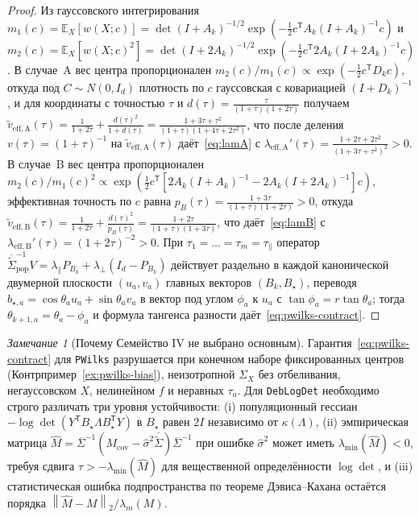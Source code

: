 \documentclass[11pt,a4paper]{article}
\numberwithin{equation}{section}
\theoremstyle{definition}
\theoremstyle{remark}
\newtheorem{remark}[theorem]{Замечание}
\newcommand{\E}{\mathbb{E}}
\newcommand{\T}{^{\mathsf T}}
\newcommand{\norm}[1]{\left\lVert #1 \right\rVert}
\begin{document}
\begin{proof}
Из гауссовского интегрирования $m_1(c) = \E_X[w(X;c)] = \det(I+A_k)^{-1/2} \exp(-\frac{1}{2} c\T A_k(I+A_k)^{-1} c)$
и $m_2(c) = \E_X[w(X;c)^2] = \det(I+2A_k)^{-1/2} \exp(-\frac{1}{2} c\T 2A_k(I+2A_k)^{-1} c)$.
В случае~A вес центра пропорционален $m_2(c)/m_1(c) \propto \exp(-\frac{1}{2} c\T D_k c)$,
откуда под $C \sim N(0, I_d)$ плотность по $c$ гауссовская с ковариацией $(I + D_k)^{-1}$,
и для координаты с точностью $\tau$ и $d(\tau) = \frac{\tau}{(1+\tau)(1+2\tau)}$ получаем
$\tilde{v}_{\mathrm{eff,A}}(\tau) = \frac{1}{1+2\tau} + \frac{d(\tau)^2}{1 + d(\tau)} = \frac{1+3\tau+\tau^2}{(1+\tau)(1+4\tau+2\tau^2)}$,
что после деления $v(\tau) = (1+\tau)^{-1}$ на $\tilde{v}_{\mathrm{eff,A}}(\tau)$ даёт~\eqref{eq:lamA}
с $\lambda_{\mathrm{eff,A}}'(\tau) = \frac{1+2\tau+2\tau^2}{(1+3\tau+\tau^2)^2} > 0$.
В случае~B вес центра пропорционален $m_2(c)/m_1(c)^2 \propto \exp(\frac{1}{2} c\T [2A_k(I+A_k)^{-1} - 2A_k(I+2A_k)^{-1}] c)$,
эффективная точность по $c$ равна $p_B(\tau) = \frac{1+3\tau}{(1+\tau)(1+2\tau)} > 0$,
откуда $\tilde{v}_{\mathrm{eff,B}}(\tau) = \frac{1}{1+2\tau} + \frac{d(\tau)^2}{p_B(\tau)} = \frac{1+2\tau}{(1+\tau)(1+3\tau)}$,
что даёт~\eqref{eq:lamB} с $\lambda_{\mathrm{eff,B}}'(\tau) = (1+2\tau)^{-2} > 0$.
При $\tau_1 = \dots = \tau_m = \tau_\parallel$ оператор $\overline{\widetilde{\Sigma}}_{\mathrm{pop}}^{-1} V
= \lambda_\parallel P_{B_k} + \lambda_\perp (I_d - P_{B_k})$ действует раздельно в каждой
канонической двумерной плоскости $(u_a, v_a)$ главных векторов $(B_k, B_\star)$, переводя
$b_{\star,a} = \cos\theta_a u_a + \sin\theta_a v_a$ в вектор под углом $\phi_a$ к $u_a$ с $\tan\phi_a = r \tan\theta_a$;
тогда $\theta_{k+1,a} = \theta_a - \phi_a$ и формула тангенса разности даёт~\eqref{eq:pwilks-contract}.
\end{proof}

\begin{remark}[Почему Семейство IV не выбрано основным]
Гарантия~\eqref{eq:pwilks-contract} для \texttt{PWilks} разрушается при конечном наборе фиксированных центров
(Контрпример~\ref{ex:pwilks-bias}), неизотропной $\Sigma_X$ без отбеливания, негауссовском $X$,
нелинейном $f$ и неравных $\tau_a$. Для \texttt{DebLogDet} необходимо строго различать три уровня устойчивости:
(i) популяционный гессиан $-\log\det(Y\T B_\star \Lambda B_\star\T Y)$ в $B_\star$ равен $2I$ независимо от $\kappa(\Lambda)$,
(ii) эмпирическая матрица $\widehat{M} = \overline{\Sigma}^{-1}(M_{\mathrm{cov}} - \hat\sigma^2 \overline{\widetilde{\Sigma}})\overline{\Sigma}^{-1}$
при ошибке $\hat\sigma^2$ может иметь $\lambda_{\min}(\widehat{M}) < 0$, требуя сдвига $\tau > -\lambda_{\min}(\widehat{M})$
для вещественной определённости $\log\det$, и
(iii) статистическая ошибка подпространства по теореме Дэвиса--Кахана остаётся порядка $\norm{\widehat{M}-M}_2 / \lambda_m(M)$.
\end{remark}
\end{document}
